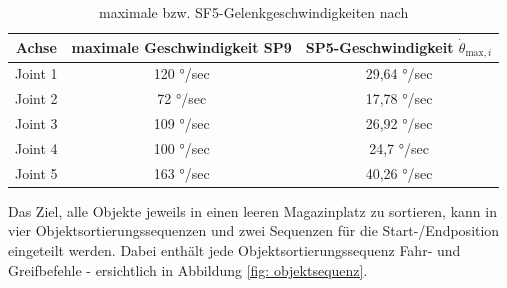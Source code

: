 \begin{table}[h!]
	\renewcommand{\arraystretch}{1.2} %
	\begin{tabular}{|c|c|c|}
		\hline
		\textbf{Achse} & \textbf{maximale Geschwindigkeit SP9} & \textbf{SP5-Geschwindigkeit $\dot{\theta}_{\text{max}, i}$} \\ \hline
		Joint 1 & 120 °/sec & 29,64 °/sec \\ \hline
		Joint 2 & 72 °/sec & 17,78 °/sec\\ \hline
		Joint 3 & 109 °/sec & 26,92 °/sec \\ \hline
		Joint 4 & 100 °/sec & 24,7 °/sec\\ \hline
		Joint 5 & 163 °/sec & 40,26 °/sec\\ \hline
	\end{tabular}
	\caption{maximale bzw. SF5-Gelenkgeschwindigkeiten nach \cite[APP-52, 1-7]{rvm1manual}}
	\label{tab:geschwindikeiten_movemaster}	
\end{table}
\newpage Das Ziel, alle Objekte jeweils in einen leeren Magazinplatz zu sortieren, kann in vier Objektsortierungssequenzen und zwei Sequenzen für die Start-/Endposition eingeteilt werden. Dabei enthält jede Objektsortierungssequenz Fahr- und Greifbefehle - ersichtlich in Abbildung \ref{fig: objektsequenz}.
